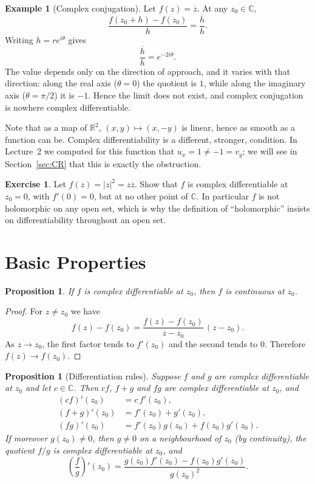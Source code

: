 \documentclass[11pt]{article}
\theoremstyle{plain}
\newtheorem{proposition}[theorem]{Proposition}
\theoremstyle{definition}
\newtheorem{example}[theorem]{Example}
\newtheorem{exercise}[theorem]{Exercise}
\theoremstyle{remark}
\numberwithin{equation}{section}
\newcommand{\be}{\begin{equation}}
\newcommand{\ee}{\end{equation}}
\newcommand{\C}{\mathbb{C}}
\newcommand{\R}{\mathbb{R}}
\begin{document}
\begin{example}[Complex conjugation]
Let $f(z)=\overline z$.  At any $z_0\in\C$,
\[
  \frac{f(z_0+h)-f(z_0)}{h}
  =\frac{\overline h}{h}.
\]
Writing $h=re^{i\theta}$ gives
\[
  \frac{\overline h}{h}=e^{-2i\theta}.
\]
The value depends only on the direction of approach, and it varies with
that direction: along the real axis ($\theta=0$) the quotient is
$1$, while along the imaginary axis ($\theta=\pi/2$) it is $-1$.  Hence
the limit does not exist, and complex conjugation is nowhere complex
differentiable.

Note that as a map of $\R^2$, $(x,y)\mapsto(x,-y)$ is linear, hence
as smooth as a function can be.  Complex differentiability is a
different, stronger, condition.  In Lecture~2 we computed for this
function that $u_x=1\ne-1=v_y$; we will see in Section~\ref{sec:CR} that
this is exactly the obstruction.
\end{example}

\begin{exercise}
Let $f(z)=|z|^2=z\overline z$.  Show that $f$ is complex differentiable
at $z_0=0$, with $f'(0)=0$, but at no other point of $\C$.  In particular
$f$ is not holomorphic on any open set, which is why the definition of
``holomorphic'' insists on differentiability throughout an open set.
\end{exercise}

\section{Basic Properties}

\begin{proposition}
If $f$ is complex differentiable at $z_0$, then $f$ is continuous at
$z_0$.
\end{proposition}

\begin{proof}
For $z\ne z_0$ we have
\be
  f(z)-f(z_0)
  =\frac{f(z)-f(z_0)}{z-z_0}\,(z-z_0).
\ee
As $z\to z_0$, the first factor tends to $f'(z_0)$ and the second tends
to $0$.  Therefore $f(z)\to f(z_0)$.
\end{proof}

\begin{proposition}[Differentiation rules]\label{prop:rules}
Suppose $f$ and $g$ are complex differentiable at $z_0$ and let
$c\in\C$.  Then $cf$, $f+g$ and $fg$ are complex differentiable at
$z_0$, and
\begin{align*}
  (cf)'(z_0)&=c\,f'(z_0),\\
  (f+g)'(z_0)&=f'(z_0)+g'(z_0),\\
  (fg)'(z_0)&=f'(z_0)g(z_0)+f(z_0)g'(z_0).
\end{align*}
If moreover $g(z_0)\ne0$, then $g\neq 0$ on a neighbourhood of $z_0$
(by continuity), the quotient $f/g$ is complex differentiable at $z_0$,
and
\be
  \left(\frac{f}{g}\right)'(z_0)
  =\frac{g(z_0)f'(z_0)-f(z_0)g'(z_0)}{g(z_0)^2}.
\ee
\end{proposition}
\end{document}
